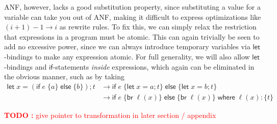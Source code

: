 \documentclass[acmsmall,screen,review]{acmart}
\newcounter{todos}
\newcommand{\TODO}[1]{{
  \stepcounter{todos}
  \begin{center}\large{\textcolor{red}{\textbf{TODO \arabic{todos}:} #1}}\end{center}
}}
\newcommand{\ms}[1]{\ensuremath{\mathsf{#1}}}
\begin{document}
ANF, however, lacks a good substitution property, since substituting a value for a variable can take
you out of ANF, making it difficult to express optimizations like $(i + 1) - 1 \to i$ as rewrite
rules. To fix this, we can simply relax the restriction that expressions in a program must be
atomic. This can again trivially be seen to add no excessive power, since we can always introduce
temporary variables via \ms{let}-bindings to make any expression atomic. For full generality, we
will also allow \ms{let}-bindings and \ms{if}-statements \textit{inside} expressions, which again
can be eliminated in the obvious manner, such as by taking
\begin{align*}
  \ms{let}\;x = (\ms{if}\;e\;\{a\}\;\ms{else}\;\{b\}); t &
    \to \ms{if}\;e\;\{\ms{let}\;x = a; t\}\;\ms{else}\;\{\ms{let}\;x = b; t\} \\ 
  & \to \ms{if}\;e\;\{\ms{br}\;\ell(x)\}\;\ms{else}\;\{\ms{br}\;\ell(x)\}\;
        \ms{where}\;\ell(x): \{t\}
\end{align*}

\TODO{give pointer to transformation in later section / appendix}
\end{document}
